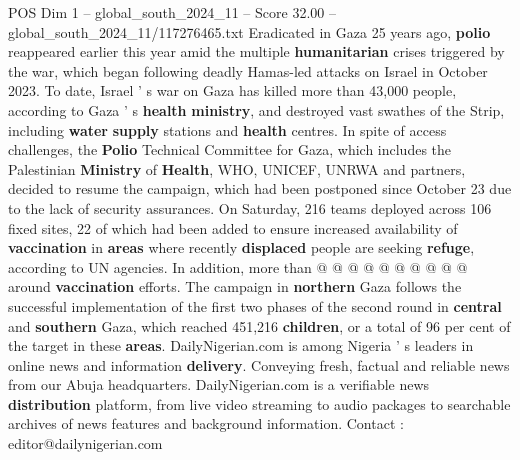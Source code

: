 \begin{textsample}{POS Dim 1 – global\_south\_2024\_11 – Score 32.00 – global\_south\_2024\_11/117276465.txt}
Eradicated in Gaza 25 years ago, \textbf{polio} reappeared earlier this year amid the multiple \textbf{humanitarian} crises triggered by the war, which began following deadly Hamas-led attacks on Israel in October 2023.
To date, Israel ' s war on Gaza has killed more than 43,000 people, according to Gaza ' s \textbf{health} \textbf{ministry}, and destroyed vast swathes of the Strip, including \textbf{water} \textbf{supply} stations and \textbf{health} centres.
In spite of access challenges, the \textbf{Polio} Technical Committee for Gaza, which includes the Palestinian \textbf{Ministry} of \textbf{Health}, WHO, UNICEF, UNRWA and partners, decided to resume the campaign, which had been postponed since October 23 due to the lack of security assurances.
On Saturday, 216 teams deployed across 106 fixed sites, 22 of which had been added to ensure increased availability of \textbf{vaccination} in \textbf{areas} where recently \textbf{displaced} people are seeking \textbf{refuge}, according to UN agencies.
In addition, more than @ @ @ @ @ @ @ @ @ @ around \textbf{vaccination} efforts.
The campaign in \textbf{northern} Gaza follows the successful implementation of the first two phases of the second round in \textbf{central} and \textbf{southern} Gaza, which reached 451,216 \textbf{children}, or a total of 96 per cent of the target in these \textbf{areas}.
DailyNigerian.com is among Nigeria ' s leaders in online news and information \textbf{delivery}.
Conveying fresh, factual and reliable news from our Abuja headquarters.
DailyNigerian.com is a verifiable news \textbf{distribution} platform, from live video streaming to audio packages to searchable archives of news features and background information.
Contact : editor@dailynigerian.com

\end{textsample}
